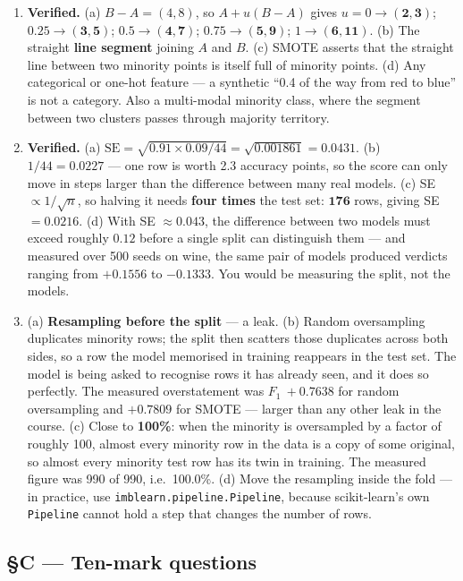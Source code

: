 \documentclass[11pt,a4paper]{article}
\newcommand{\A}[1]{\item[\textbf{#1}]}
\begin{document}
\begin{enumerate}[leftmargin=1.9cm]
\A{U4.74} \textbf{Verified.} (a) $B - A = (4, 8)$, so
$A + u(B-A)$ gives $u=0 \to \mathbf{(2,3)}$; $0.25 \to \mathbf{(3,5)}$;
$0.5 \to \mathbf{(4,7)}$; $0.75 \to \mathbf{(5,9)}$; $1 \to \mathbf{(6,11)}$.
(b) The straight \textbf{line segment} joining $A$ and $B$. (c) SMOTE asserts
that the straight line between two minority points is itself full of minority
points. (d) Any categorical or one-hot feature --- a synthetic ``0.4 of the way
from red to blue'' is not a category. Also a multi-modal minority class, where
the segment between two clusters passes through majority territory.

\A{U4.75} \textbf{Verified.} (a)
$\text{SE} = \sqrt{0.91 \times 0.09/44} = \sqrt{0.001861} = \mathbf{0.0431}$.
(b) $1/44 = \mathbf{0.0227}$ --- one row is worth 2.3 accuracy points, so the
score can only move in steps larger than the difference between many real
models. (c) SE $\propto 1/\sqrt{n}$, so halving it needs \textbf{four times}
the test set: $\mathbf{176}$ rows, giving SE $= 0.0216$. (d) With SE $\approx
0.043$, the difference between two models must exceed roughly $0.12$ before a
single split can distinguish them --- and measured over 500 seeds on wine, the
same pair of models produced verdicts ranging from $+0.1556$ to $-0.1333$. You
would be measuring the split, not the models.

\A{U4.76} (a) \textbf{Resampling before the split} --- a leak.
(b) Random oversampling duplicates minority rows; the split then scatters those
duplicates across both sides, so a row the model memorised in training
reappears in the test set. The model is being asked to recognise rows it has
already seen, and it does so perfectly. The measured overstatement was
$F_1\ +0.7638$ for random oversampling and $+0.7809$ for SMOTE --- larger than
any other leak in the course. (c) Close to \textbf{100\%}: when the minority is
oversampled by a factor of roughly 100, almost every minority row in the data
is a copy of some original, so almost every minority test row has its twin in
training. The measured figure was 990 of 990, i.e.\ 100.0\%. (d) Move the
resampling inside the fold --- in practice, use
\texttt{imblearn.pipeline.Pipeline}, because scikit-learn's own
\texttt{Pipeline} cannot hold a step that changes the number of rows.
\end{enumerate}

\subsection*{§C --- Ten-mark questions}
\end{document}
